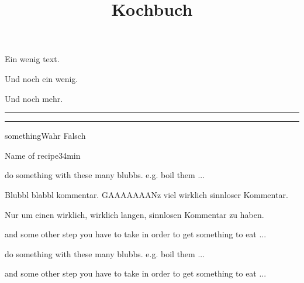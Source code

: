 \documentclass[ngerman,parskip=full]{article}
\title{Kochbuch}
\begin{document}
\maketitle

Ein wenig text.\par
\noindent Und noch ein wenig.
\par\par
Und noch mehr.
 
\noindent
\begin{minipage}{\linewidth}{\rule{.9\linewidth}{3pt}}
\end{minipage}
\par\par
\noindent
\begin{minipage}{\linewidth}{\rule{.9\linewidth}{3pt}}
\end{minipage}


\let\something\relax
\expandafter\ifx\csname something\endcsname\relax Wahr \else Falsch \fi


\begin{recipe}{Name of recipe}{3}{4min}
\begin{step}{do something with these many blubbs. e.g. boil them ...}
\end{step}
Blubbl blabbl kommentar. GAAAAAAANz viel wirklich sinnloser Kommentar.\par
Nur um einen wirklich, wirklich langen, sinnlosen Kommentar zu haben.
\begin{step}{and some other step you have to take in order to get
    something to eat ...}
\end{step}
\begin{step}{do something with these many blubbs. e.g. boil them ...}
\end{step}
\begin{step}{and some other step you have to take in order to get
    something to eat ...}
\end{step}
\end{recipe}
\end{document}
